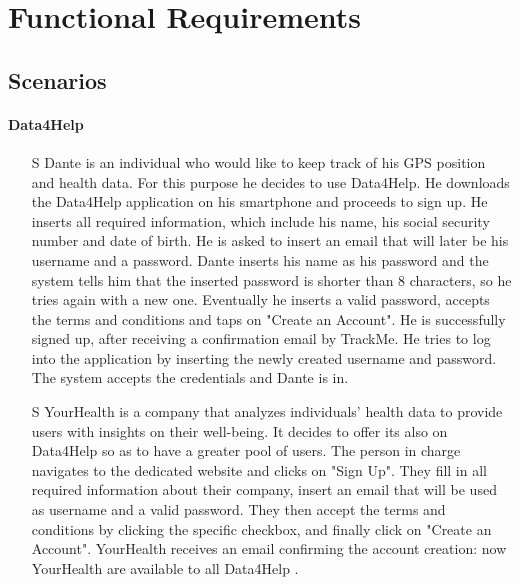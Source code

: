 \documentclass[../../rasd.tex]{subfiles}
\begin{document}
\section{Functional Requirements}


		\subsection{Scenarios}
            \paragraph{Data4Help}
                \begin{itemize}
                    
                    \item[S\subs{1}] Dante is an individual who would like to keep track of his GPS position and health data. For this purpose he decides to use Data4Help. He downloads the Data4Help application on his smartphone and proceeds to sign up. He inserts all required information, which include his name, his social security number and date of birth. He is asked to insert an email that will later be his username and a password. Dante inserts his name as his password and the system tells him that the inserted password is shorter than 8 characters, so he tries again with a new one. Eventually he inserts a valid password, accepts the terms and conditions and taps on "Create an Account". He is successfully signed up, after receiving a confirmation email by TrackMe. He tries to log into the application by inserting the newly created username and password. The system accepts the credentials and Dante is in.
                    
                    \item[S\subs{2}] YourHealth is a company that analyzes individuals' health data to provide users with insights on their well-being. It decides to offer its  also on Data4Help so as to have a greater pool of users. The person in charge navigates to the  dedicated website and clicks on "Sign Up". They fill in all required information about their company, insert an email that will be used as username and a valid password. They then accept the terms and conditions by clicking the specific checkbox, and finally click on "Create an Account". YourHealth receives an email confirming the account creation: now YourHealth  are available to all Data4Help .
                    

\end{itemize}
\end{document}
